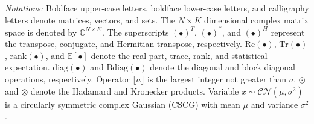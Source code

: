\documentclass[10pt,journal,twocolumn]{IEEEtran}
\begin{document}
\emph{Notations:} Boldface upper-case letters, boldface lower-case letters, and calligraphy letters denote matrices, vectors, and sets. The $N\times K$ dimensional complex matrix space is denoted by $\mathbb{C}^{N\times K}$. The superscripts ${(\bullet)}^T$, ${(\bullet)}^*$, and ${(\bullet)}^H$ represent the transpose, conjugate, and Hermitian transpose, respectively. $\text{Re}\left( \bullet\right)$, $\text{Tr}\left( \bullet\right)$,  $\text{rank}\left( \bullet\right)$, and $\mathbb{E}\left[\bullet\right]$ 
 denote the real part, trace, rank, and statistical expectation. $\text{diag}\left( \bullet\right)$  and $\text{Bdiag}\left( \bullet\right)$ denote the diagonal and block diagonal operations, respectively. Operator $\lfloor a\rfloor$  is the largest integer not greater than $a$. $\odot$ and $\otimes$ denote the Hadamard and Kronecker products. Variable  $x\sim\mathcal{CN}(\mu, \sigma^2)$ is a  circularly symmetric complex Gaussian (CSCG)   with mean $\mu$ and variance $\sigma^2$.
\end{document}
